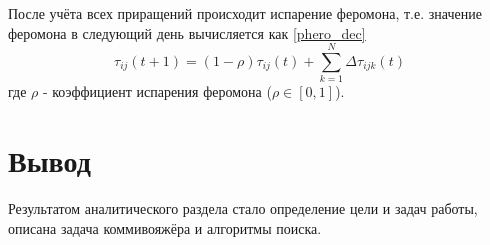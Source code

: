 После учёта всех приращений происходит испарение феромона, т.е. значение феромона в следующий день вычисляется как \ref{phero_dec}
\begin{equation}\label{phero_dec}
	\tau_{ij}(t+1) = (1-\rho)\tau_{ij}(t) + \sum\limits_{k=1}^{N} \Delta\tau_{ijk}(t)
\end{equation} где
	$\rho$ - коэффициент испарения феромона ($\rho \in [0,1]$).


\section*{Вывод}
Результатом аналитического раздела стало определение цели и задач работы, описана задача коммивояжёра и алгоритмы поиска.